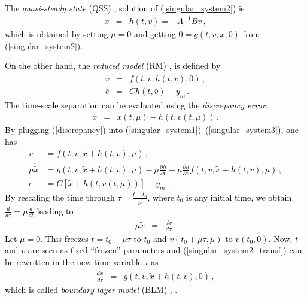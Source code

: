 \documentclass[review]{elsarticle}
\begin{document}
\textcolor{black}{
The \textit{quasi-steady state} (QSS) \cite{K:2002}, \cite{KKO:1986} solution of %
(\ref{singular_system2}) is
%
\begin{eqnarray} \label{QSS}
x &=& h(t,v)=-A^{-1}Bv\,,
\end{eqnarray}
%
which is obtained by setting $\mu=0$ and getting $0=g(t,v,x,0)$ from (\ref{singular_system2}). }


\textcolor{black}{
On the other hand, the \textit{reduced model} (RM) \cite{K:2002}, \cite{KKO:1986} is defined by
%
\begin{eqnarray} \label{RM}
\dot{\bar{v}} &=& f(t,\bar{v},h(t,\bar{v}),0)\,,\\
\bar{e}&=&Ch(t,\bar{v})-y_m\,. \label{RM2}
\end{eqnarray}
%
The time-scale separation can be evaluated \textcolor{black}{using} the \textit{discrepancy error}:
%
\begin{eqnarray} \label{discrepancy}
\tilde{x} &=& x(t,\mu)-h(t,v(t,\mu))\,.
\end{eqnarray}
%
By plugging (\ref{discrepancy}) into (\ref{singular_system1})--(\ref{singular_system3}), one has
%
\begin{align} \label{singular_system1_transf}
\dot v \!&=\! f(t,v,\tilde{x}+h(t,v),\mu)\,,\\
\mu \dot{\tilde{x}} \!&=\! g(t,v,\tilde{x}\!+\!h(t,v),\mu)\!-\!\mu \frac{\partial{h}}{\partial{t}} \!-\!\mu \frac{\partial{h}}{\partial{v}}
f(t,v,\tilde{x}\!+\!h(t,v),\mu)\,, \label{singular_system2_transf} \\
e&=C[\tilde{x}+h(t,v(t,\mu))]-y_m\,. \label{singular_system3_transf}
\end{align}
%
By rescaling the time through $\tau=\frac{t-t_0}{\mu}$, where $t_0$ is any initial time, we obtain
$\frac{d}{d\tau}=\mu \frac{d}{dt}$ leading to
%
\begin{eqnarray} \label{new_singular_system2_transf}
\mu \dot{\tilde{x}} &=& \frac{d\tilde{x}}{d\tau}\,.
\end{eqnarray}
%
Let $\mu=0$. This freezes $t=t_0+\mu\tau$ to $t_0$ and $v(t_0+\mu\tau,\mu)$ to $v(t_0,0)$. Now, $t$ and $v$
are seen as fixed ``frozen'' parameters and (\ref{singular_system2_transf}) can be rewritten in the new time variable $\tau$ as
%
\begin{eqnarray} \label{BLM}
\frac{d\tilde{x}}{d\tau} &=& g(t,v,\tilde{x}+h(t,v),0)\,,
\end{eqnarray}
%
which is called \textit{boundary layer model} (BLM) \cite{K:2002}, \cite{KKO:1986}. }
\end{document}

